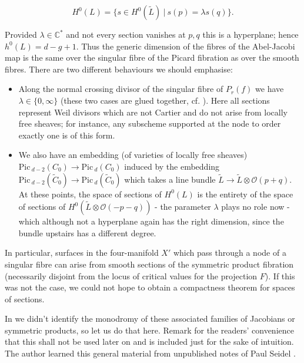 \documentclass[10pt]{article}
\newcommand{\cc}{\mathbb{C}}
\newcommand{\Pic}{\mathrm{Pic \,}}
\begin{document}
$$H^0 (L) = \{ s \in H^0 (\tilde{L}) \ | \ s(p) = \lambda s(q) \}.$$

\noindent Provided $\lambda \in \cc^*$ and not every section vanishes
at $p,q$ this is a hyperplane; hence $h^0 (L) = d-g+1$.  Thus the
generic dimension of the fibres of the Abel-Jacobi map is the same
over the singular fibre of the Picard fibration as over the smooth
fibres.  There are two different behaviours we should emphasise:

\begin{itemize}
\item Along the normal
crossing divisor of the singular fibre of $P_r(f)$ we have $\lambda
\in \{0, \infty\}$ (these two cases are glued together,
cf. \cite{SKDIS}).  Here all sections
represent Weil divisors which are not Cartier and do not arise from
locally free sheaves; for instance, any subscheme supported at the
node to order exactly one is of this form.  
\item We also have an embedding (of varieties
of locally free sheaves)
$\Pic_{d-2}(C_0) \rightarrow \Pic_d (C_0)$ induced by the embedding
$\Pic_{d-2}(\tilde{C}_0) \rightarrow \Pic_d (\tilde{C}_0)$ which takes
a line bundle $\tilde{L} \rightarrow \tilde{L} \otimes
\mathcal{O}(p+q)$.  At these points,
the space of sections of $H^0 (L)$ is the entirety of the space of
sections of $H^0 (\tilde{L} \otimes \mathcal{O}(-p-q))$ - the parameter
$\lambda$ plays no role now - which although
not a hyperplane again has the right dimension, since the bundle
upstairs has a different degree.  
\end{itemize}

\noindent In particular, surfaces in the four-manifold $X'$ which pass
through a node of a singular fibre can arise from smooth sections of the
symmetric product fibration (necessarily disjoint from the locus of
critical values for the projection $F$).  If this was not the case, we
could not hope 
to obtain a compactness theorem for spaces of sections.

\vspace{0.2cm}

\noindent In \cite{SKDIS}
we didn't identify the monodromy of these associated families of
Jacobians or symmetric products, so let us do that here.    
Remark for the readers' convenience that this shall not be used later
on and is included just for the sake of intuition.  The author learned
this general material from unpublished notes of Paul Seidel
\cite{Seidel:thesisdraft}.
\end{document}
